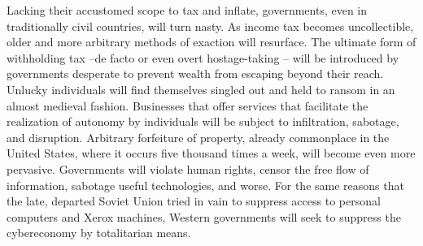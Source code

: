 \begin{paracol}{2}[]
\switchcolumn
Lacking their accustomed scope to tax and inflate, governments, even in traditionally civil countries, will turn nasty. As income tax becomes uncollectible, older and more arbitrary methods of exaction will resurface. The ultimate form of withholding tax --de facto or even overt hostage-taking -- will be introduced by governments desperate to prevent wealth from escaping beyond their reach. Unlucky individuals will find themselves singled out and held to ransom in an almost medieval fashion. Businesses that offer services that facilitate the realization of autonomy by individuals will be subject to infiltration, sabotage, and disruption. Arbitrary forfeiture of property, already commonplace in the United States, where it occurs five thousand times a week, will become even more pervasive. Governments will violate human rights, censor the free flow of information, sabotage useful technologies, and worse. For the same reasons that the late, departed Soviet Union tried in vain to suppress access to personal computers and Xerox machines, Western governments will seek to suppress the cybereconomy by totalitarian means.
\end{paracol}


